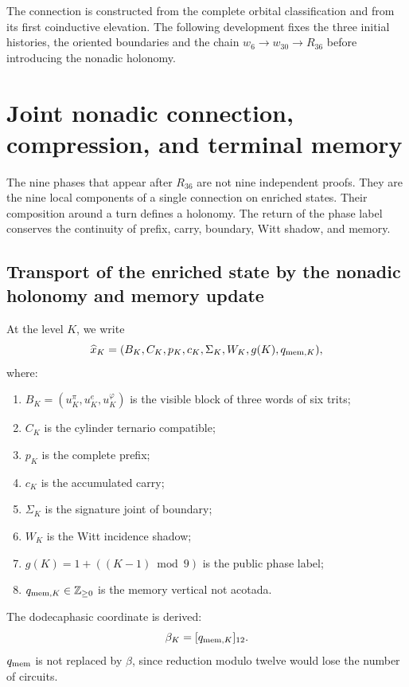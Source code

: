 \label{chap:83-07}

The connection is constructed from the complete orbital classification and from
its first coinductive elevation. The following development fixes the three
initial histories, the oriented boundaries and the chain
\(w_6\to w_{30}\to R_{36}\) before introducing the nonadic holonomy.

\begin{HMTScientificOwnerSubordinated}

\end{HMTScientificOwnerSubordinated}


\section{Joint nonadic connection, compression, and terminal memory}
\label{p12-83-c7-s1:chap:conexion-nonadica-conjunta}

The nine phases that appear after \(R_{36}\) are not nine independent
proofs. They are the nine local components of a single connection
on enriched states. Their composition around a turn defines
a holonomy. The return of the phase label conserves the continuity of
prefix, carry, boundary, Witt shadow, and memory.

\subsection{Transport of the enriched state by the nonadic holonomy and memory update}

At the level \(K\), we write
\[
 \widehat x_K=
 (B_K,C_K,p_K,c_K,\Sigma_K,W_K,g(K),q_{{\rm mem},K}),
\]
where:
\begin{enumerate}
 \item \(B_K=(u_K^\pi,u_K^e,u_K^\varphi)\) is the visible block of three
       words of six trits;
 \item \(C_K\) is the cylinder ternario compatible;
 \item \(p_K\) is the complete prefix;
 \item \(c_K\) is the accumulated carry;
 \item \(\Sigma_K\) is the signature joint of boundary;
 \item \(W_K\) is the Witt incidence shadow;
 \item \(g(K)=1+((K-1)\bmod9)\) is the public phase label;
 \item \(q_{{\rm mem},K}\in\mathbb Z_{\geq0}\) is the memory vertical not
       acotada.
\end{enumerate}
The dodecaphasic coordinate is derived:
\[
 \beta_K=[q_{{\rm mem},K}]_{12}.
\]
\(q_{\rm mem}\) is not replaced by \(\beta\), since reduction modulo
twelve would lose the number of circuits.

